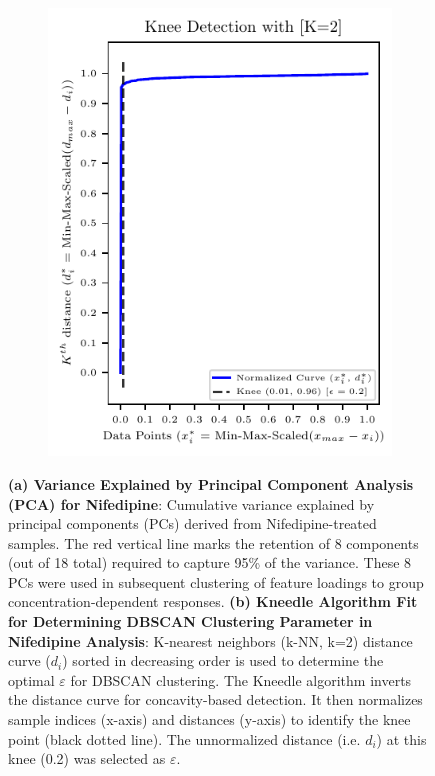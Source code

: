 \documentclass{report}
\begin{document}
\begin{figure}[H]
\begin{subfigure}[b]{0.4\textwidth}
                    \includegraphics[width=\textwidth]{plots/chapter_6/pfa_dbscan_kneedle_curve_nifedipine.pdf}
                    \caption[Kneedle Algorithm Fit for Determining DBSCAN Clustering Parameter (\(\varepsilon\)) in Nifedipine Analysis]{}
                    \label{fig:kneedle-curve}
                \end{subfigure}
                \caption[Variance Explained by PCA and Kneedle Fit]{\textbf{(a) Variance Explained by Principal Component Analysis (PCA) for Nifedipine}: 
                   Cumulative variance explained by principal components (PCs) derived from Nifedipine-treated samples. The red vertical line marks the retention of 8 components (out of 18 total) required to capture 95\% of the variance. These 8 PCs were used in subsequent clustering of feature loadings to group concentration-dependent responses. \textbf{(b) Kneedle Algorithm Fit for Determining DBSCAN Clustering Parameter in Nifedipine Analysis}: K-nearest neighbors (k-NN, k=2) distance curve ($d_i$) sorted in decreasing order is used to determine the optimal \(\varepsilon\) for DBSCAN clustering. The Kneedle algorithm inverts the distance curve for concavity-based detection. It then normalizes sample indices (x-axis) and distances (y-axis) to identify the knee point (black dotted line). The unnormalized distance (i.e. ${d_i}$) at this knee (0.2) was selected as \(\varepsilon\).
                   }
        \end{figure}
        
\end{document}
